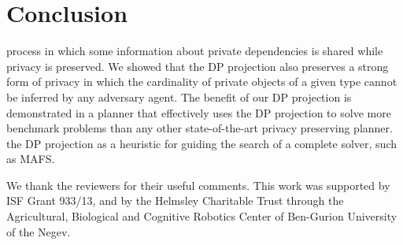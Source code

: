 \documentclass[letterpaper]{article}
\theoremstyle{definition}
\begin{document}
\vspace{-3.53mm}
\section{Conclusion}
process in which some information about private dependencies is shared while privacy is preserved. We showed that the DP projection also preserves a strong form of privacy in which the cardinality of private objects of a given type cannot be inferred by any adversary agent. The benefit of our DP projection is demonstrated in a planner that effectively uses the DP projection to solve more benchmark problems than any other state-of-the-art privacy preserving planner.  the DP projection as a heuristic for guiding the search of a complete solver, such as MAFS.

 We thank the reviewers for their useful comments. This work was supported by ISF Grant 933/13, and by the Helmsley Charitable Trust through the Agricultural, Biological and Cognitive Robotics Center of Ben-Gurion University of the Negev.









\clearpage

\end{document}
